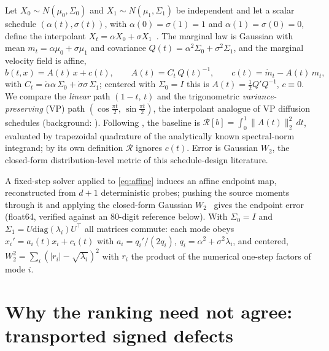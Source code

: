 \documentclass{article}
\newcommand{\wtwo}{W_2}
\begin{document}
Let $X_0\sim N(\mu_0,\Sigma_0)$ and $X_1\sim N(\mu_1,\Sigma_1)$ be
independent and let a scalar schedule $(\alpha(t),\sigma(t))$, with
$\alpha(0)=\sigma(1)=1$ and $\alpha(1)=\sigma(0)=0$, define the interpolant
$X_t=\alpha X_0+\sigma X_1$~\citep{albergo2025stochastic,lipman2023flow}.
The marginal law is Gaussian with mean $m_t=\alpha\mu_0+\sigma\mu_1$ and
covariance $Q(t)=\alpha^2\Sigma_0+\sigma^2\Sigma_1$, and the marginal
velocity field is affine,
\begin{equation}
  b(t,x)=A(t)\,x+c(t),\qquad
  A(t)=C_t\,Q(t)^{-1},\qquad
  c(t)=\dot m_t-A(t)\,m_t,
  \label{eq:affine}
\end{equation}
with $C_t=\dot\alpha\alpha\,\Sigma_0+\dot\sigma\sigma\,\Sigma_1$; centered
with $\Sigma_0=I$ this is $A(t)=\tfrac12 Q'Q^{-1}$, $c\equiv0$. We
compare the \emph{linear} path $(1-t,\,t)$ and the trigonometric
\emph{variance-preserving} (VP) path
$(\cos\tfrac{\pi t}{2},\,\sin\tfrac{\pi t}{2})$, the interpolant
analogue of VP diffusion schedules (background:
\citealp{song2021score}). Following \citet{lipschitzguided2025}, the
baseline is $\mathcal{R}[b]=\int_0^1\|A(t)\|_2^2\,dt$, evaluated by
trapezoidal quadrature of the analytically known spectral-norm
integrand; by its own definition $\mathcal{R}$ ignores $c(t)$. Error is
Gaussian $\wtwo$, the closed-form distribution-level metric of this
schedule-design literature.

A fixed-step solver applied to \eqref{eq:affine} induces an affine
endpoint map, reconstructed from $d{+}1$ deterministic probes; pushing
the source moments through it and applying the closed-form Gaussian
$\wtwo$~\citep{gelbrich1990formula} gives the endpoint error (float64,
verified against an 80-digit reference below). With
$\Sigma_0=I$ and $\Sigma_1=U\mathrm{diag}(\lambda_i)U^{\top}$ all matrices
commute: each mode obeys $x_i'=a_i(t)x_i+c_i(t)$ with $a_i=q_i'/(2q_i)$,
$q_i=\alpha^2+\sigma^2\lambda_i$, and centered,
$\wtwo^2=\sum_i(|r_i|-\sqrt{\lambda_i})^2$ with $r_i$ the product of the
numerical one-step factors of mode $i$.

\section{Why the ranking need not agree: transported signed defects}
\label{sec:mechanism}
\end{document}
